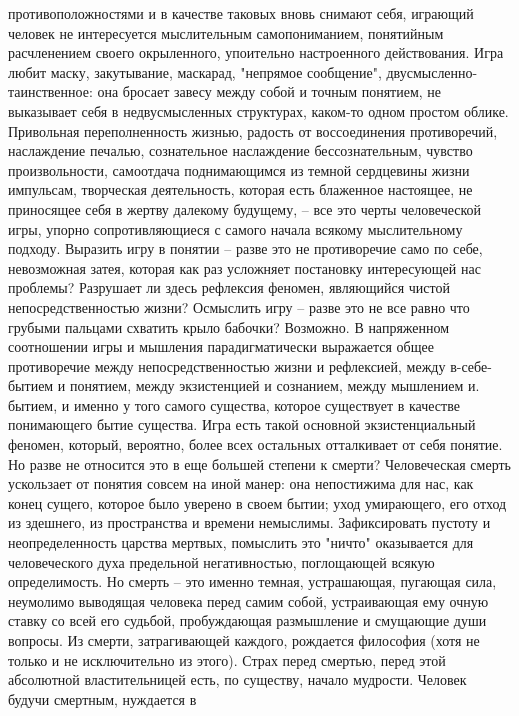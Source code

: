 \documentclass[12pt]{article}
\begin{document}
противоположностями  и  в  качестве  таковых  вновь  снимают  себя,  играющий  человек  не  интересуется
мыслительным самопониманием,  понятийным расчленением своего окрыленного,  упоительно настроенного
действования. Игра любит маску, закутывание, маскарад, "непрямое сообщение", двусмысленно-таинственное:
она бросает завесу между собой и точным понятием, не выказывает себя в недвусмысленных структурах, каком-то  одном простом  облике.  Привольная переполненность  жизнью,  радость от воссоединения противоречий,
наслаждение  печалью,  сознательное  наслаждение  бессознательным,  чувство  произвольности,  самоотдача
поднимающимся из темной сердцевины жизни импульсам, творческая деятельность, которая есть блаженное
настоящее, не приносящее себя в жертву далекому будущему, -- все это черты человеческой игры, упорно
сопротивляющиеся с самого начала всякому мыслительному подходу. Выразить игру в понятии -- разве это не
противоречие  само  по  себе,  невозможная  затея,  которая  как  раз  усложняет  постановку  интересующей  нас
проблемы?  Разрушает  ли  здесь  рефлексия  феномен,  являющийся  чистой  непосредственностью  жизни?
Осмыслить игру  -- разве это  не все равно что грубыми пальцами схватить крыло бабочки?  Возможно.  В
напряженном  соотношении  игры  и  мышления  парадигматически  выражается  общее  противоречие  между
непосредственностью жизни и рефлексией, между в-себе-бытием и понятием, между экзистенцией и сознанием,
между мышлением и. бытием, и именно у того самого существа, которое существует в качестве понимающего
бытие  существа.  Игра  есть  такой  основной  экзистенциальный  феномен,  который,  вероятно,  более  всех
остальных отталкивает от себя понятие.
Но разве не относится это в еще большей степени к смерти? Человеческая смерть ускользает от понятия совсем
на иной  манер: она непостижима для нас,  как  конец  сущего,  которое  было  уверено  в  своем  бытии; уход
умирающего,  его  отход  из  здешнего,  из  пространства  и  времени  немыслимы.  Зафиксировать  пустоту  и
неопределенность царства мертвых, помыслить это "ничто" оказывается для человеческого духа предельной
негативностью,  поглощающей  всякую  определимость.  Но  смерть  --  это  именно  темная,  устрашающая,
пугающая сила, неумолимо выводящая человека перед самим собой, устраивающая ему очную ставку со всей
его судьбой, пробуждающая размышление и смущающие души вопросы. Из смерти, затрагивающей каждого,
рождается  философия  (хотя  не  только  и  не  исключительно  из  этого).  Страх  перед  смертью,  перед  этой
абсолютной  властительницей есть, по  существу, начало  мудрости.  Человек  будучи смертным,  нуждается в
\end{document}
